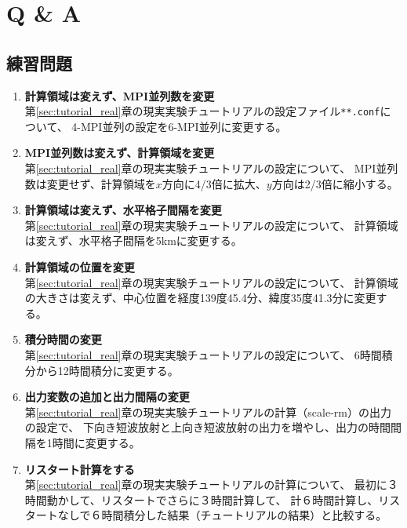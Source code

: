 \chapter{Q \& A}
\label{sec:practice}

\section*{練習問題}

\begin{enumerate}
\item {\bf 計算領域は変えず、MPI並列数を変更}\\
第\ref{sec:tutorial_real}章の現実実験チュートリアルの設定ファイル\verb|**.conf|について、
4-MPI並列の設定を6-MPI並列に変更する。

\item {\bf MPI並列数は変えず、計算領域を変更}\\
第\ref{sec:tutorial_real}章の現実実験チュートリアルの設定について、
MPI並列数は変更せず、計算領域を$x$方向に4/3倍に拡大、$y$方向は2/3倍に縮小する。

\item {\bf 計算領域は変えず、水平格子間隔を変更}\\
第\ref{sec:tutorial_real}章の現実実験チュートリアルの設定について、
計算領域は変えず、水平格子間隔を5kmに変更する。

\item {\bf 計算領域の位置を変更}\\
第\ref{sec:tutorial_real}章の現実実験チュートリアルの設定について、
計算領域の大きさは変えず、中心位置を経度139度45.4分、緯度35度41.3分に変更する。

\item {\bf 積分時間の変更}\\
第\ref{sec:tutorial_real}章の現実実験チュートリアルの設定について、
6時間積分から12時間積分に変更する。

\item {\bf 出力変数の追加と出力間隔の変更}\\
第\ref{sec:tutorial_real}章の現実実験チュートリアルの計算（scale-rm）の出力の設定で、
下向き短波放射と上向き短波放射の出力を増やし、出力の時間間隔を1時間に変更する。

\item {\bf リスタート計算をする}\\
第\ref{sec:tutorial_real}章の現実実験チュートリアルの計算について、
最初に３時間動かして、リスタートでさらに３時間計算して、
計６時間計算し、リスタートなしで６時間積分した結果（チュートリアルの結果）と比較する。





\end{enumerate}


